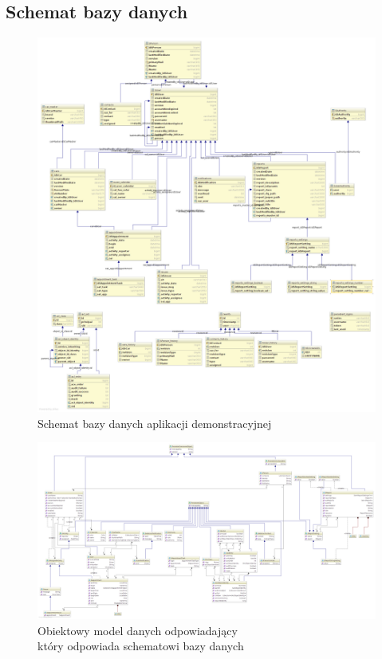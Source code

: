 	\subsection{Schemat bazy danych}
	\begin{figure}[H]
		\centering
		\includegraphics[width=1.1\textwidth]{images/db_UML}
		\caption[Schemat bazy danych aplikacji demonstracyjnej]{
			Schemat bazy danych aplikacji demonstracyjnej
		}
		\label{app:schema_db}
	\end{figure}
	\begin{figure}[H]
		\centering
		\includegraphics[angle=90,height=\textheight]{images/springatom_model_uml}
		\caption[Obiektowy model danych]{
			Obiektowy model danych odpowiadający\\który odpowiada schematowi bazy danych
		}
		\label{app:schema_org_agatom_springatom_model}
	\end{figure}
